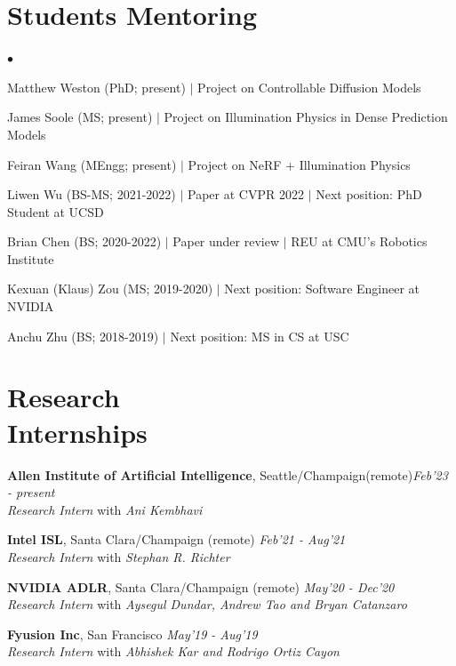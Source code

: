 \documentclass[margin,line]{res}
\newenvironment{list2}{
  \begin{list}{$\bullet$}{%
      \setlength{\itemsep}{0in}
      \setlength{\parsep}{0in} \setlength{\parskip}{0in}
      \setlength{\topsep}{0in} \setlength{\partopsep}{0in} 
      \setlength{\leftmargin}{0.2in}}}{\end{list}}
\begin{document}
\begin{resume}
\section{\sc \large Students Mentoring}
\begin{list2}
\item Matthew Weston (PhD; present) $|$ Project on Controllable Diffusion Models
\item James Soole (MS; present) $|$ Project on Illumination Physics in Dense Prediction Models
\item Feiran Wang (MEngg; present) $|$ Project on NeRF + Illumination Physics
\item Liwen Wu (BS-MS; 2021-2022) $|$ Paper at CVPR 2022 $|$ Next position: PhD Student at UCSD
\item Brian Chen (BS; 2020-2022) $|$  Paper under review $|$ REU at CMU's Robotics Institute
\item Kexuan (Klaus) Zou (MS; 2019-2020) $|$ Next position: Software Engineer at NVIDIA
\item Anchu Zhu (BS; 2018-2019) $|$ Next position: MS in CS at USC 
\end{list2}

\section{\sc \large Research \\ Internships}
{\bf Allen Institute of Artificial Intelligence}, Seattle/Champaign(remote)\hfill  {\em Feb'23 - present}\\
{\em Research Intern}  with {\em Ani Kembhavi}
\vspace*{-0.05in}

{\bf Intel ISL}, Santa Clara/Champaign (remote) \hfill  {\em Feb'21 - Aug'21}\\
{\em Research Intern} with {\em Stephan R. Richter}
\vspace*{-0.05in}

{\bf NVIDIA ADLR}, Santa Clara/Champaign (remote) \hfill  {\em May'20 - Dec'20}\\
{\em Research Intern}  with {\em Aysegul Dundar, Andrew Tao and Bryan Catanzaro}
\vspace*{-0.05in}

{\bf Fyusion Inc},  San Francisco \hfill  {\em May'19 - Aug'19}\\
{\em Research Intern}  with {\em Abhishek Kar and Rodrigo Ortiz Cayon}
\vspace*{-0.05in}


\end{resume}
\end{document}
